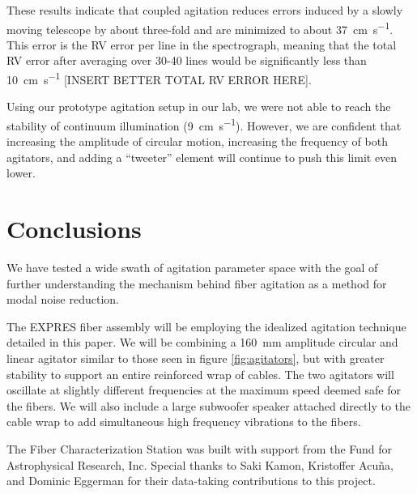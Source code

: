 \documentclass[twocolumn]{emulateapj}
\begin{document}
These results indicate that coupled agitation reduces errors induced by a slowly moving telescope by about three-fold and are minimized to about \SI{37}{\centi\meter\per\second}. This error is the RV error per line in the spectrograph, meaning that the total RV error after averaging over 30-40 lines would be significantly less than \SI{10}{\centi\meter\per\second} [INSERT BETTER TOTAL RV ERROR HERE].

Using our prototype agitation setup in our lab, we were not able to reach the stability of continuum illumination (\SI{9}{\centi\meter\per\second}). However, we are confident that increasing the amplitude of circular motion, increasing the frequency of both agitators, and adding a ``tweeter'' element will continue to push this limit even lower.

\section{Conclusions}
\label{sec:conclusions}

We have tested a wide swath of agitation parameter space with the goal of further understanding the mechanism behind fiber agitation as a method for modal noise reduction. 

The EXPRES fiber assembly will be employing the idealized agitation technique detailed in this paper. We will be combining a \SI{160}{\milli\meter} amplitude circular and linear agitator similar to those seen in figure \ref{fig:agitators}, but with greater stability to support an entire reinforced wrap of cables. The two agitators will oscillate at slightly different frequencies at the maximum speed deemed safe for the fibers. We will also include a large subwoofer speaker attached directly to the cable wrap to add simultaneous high frequency vibrations to the fibers.

\acknowledgments

The Fiber Characterization Station was built with support from the Fund for Astrophysical Research, Inc. Special thanks to Saki Kamon, Kristoffer Acu\~na, and Dominic Eggerman for their data-taking contributions to this project.

\end{document}
